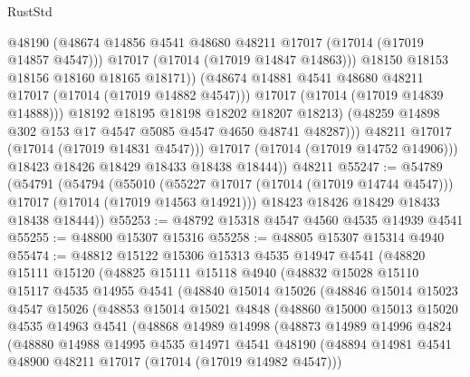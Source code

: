 \begin{lexlean}{RustStd}
\begin{coremodule}
{\begin{coremodule}
{{{{{{{{{{{{{{{{{{{{{{{{{{{{{{{{{{{{{{{{{{{{{{{{{{{{{{{                          @48190
                          (@48674 @14856 @4541 @48680 @48211 @17017 (@17014 (@17019 @14857 @4547)))
                          @17017
                          (@17014 (@17019 @14847 @14863)))
                        @18150
                        @18153
                        @18156
                        @18160
                        @18165
                        @18171))
                    (@48674 @14881 @4541 @48680 @48211 @17017 (@17014 (@17019 @14882 @4547)))
                    @17017
                    (@17014 (@17019 @14839 @14888)))
                  @18192
                  @18195
                  @18198
                  @18202
                  @18207
                  @18213)
                (@48259 @14898 @302 @153 @17 @4547 @5085 @4547 @4650 @48741 @48287)))
            @48211
            @17017
            (@17014 (@17019 @14831 @4547)))
          @17017
          (@17014 (@17019 @14752 @14906)))
        @18423
        @18426
        @18429
        @18433
        @18438
        @18444))
    @48211
@55247 := @54789
    (@54791
      (@54794
        (@55010
          (@55227 @17017 (@17014 (@17019 @14744 @4547)))
          @17017
          (@17014 (@17019 @14563 @14921)))
        @18423
        @18426
        @18429
        @18433
        @18438
        @18444))
@55253 := @48792 @15318 @4547 @4560 @4535 @14939 @4541
@55255 := @48800 @15307 @15316
@55258 := @48805 @15307 @15314 @4940
@55474 := @48812
    @15122
    @15306
    @15313
    @4535
    @14947
    @4541
    (@48820
      @15111
      @15120
      (@48825
        @15111
        @15118
        @4940
        (@48832
          @15028
          @15110
          @15117
          @4535
          @14955
          @4541
          (@48840
            @15014
            @15026
            (@48846
              @15014
              @15023
              @4547
              @15026
              (@48853
                @15014
                @15021
                @4848
                (@48860
                  @15000
                  @15013
                  @15020
                  @4535
                  @14963
                  @4541
                  (@48868
                    @14989
                    @14998
                    (@48873
                      @14989
                      @14996
                      @4824
                      (@48880
                        @14988
                        @14995
                        @4535
                        @14971
                        @4541
                        @48190
                        (@48894 @14981 @4541 @48900 @48211 @17017 (@17014 (@17019 @14982 @4547)))
}}}}}}}}}}}}}}}}}}}}}}}}}}}}}}}}}}}}}}}}}}}}}}}}}}}}}}}
\end{coremodule}}
\end{coremodule}
\end{lexlean}
